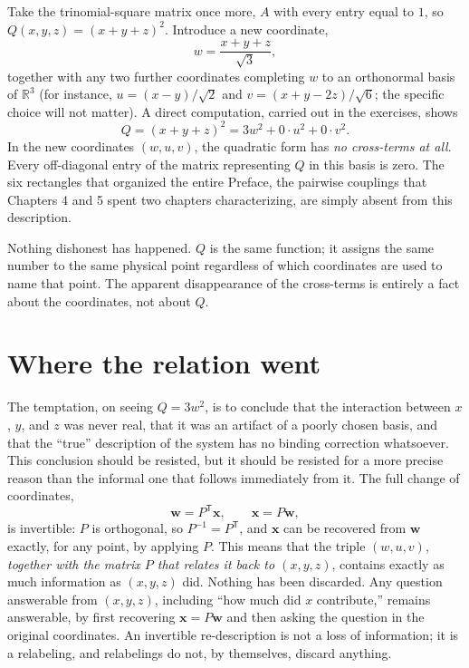 \documentclass[11pt]{book}
\begin{document}
Take the trinomial-square matrix once more, $A$ with every entry equal to $1$, so $Q(x,y,z)=(x+y+z)^2$. Introduce a new coordinate,
\[
w = \frac{x+y+z}{\sqrt3},
\]
together with any two further coordinates completing $w$ to an orthonormal basis of $\mathbb{R}^3$ (for instance, $u=(x-y)/\sqrt2$ and $v=(x+y-2z)/\sqrt6$; the specific choice will not matter). A direct computation, carried out in the exercises, shows
\[
Q = (x+y+z)^2 = 3w^2 + 0\cdot u^2 + 0\cdot v^2.
\]
In the new coordinates $(w,u,v)$, the quadratic form has \emph{no cross-terms at all}. Every off-diagonal entry of the matrix representing $Q$ in this basis is zero. The six rectangles that organized the entire Preface, the pairwise couplings that Chapters 4 and 5 spent two chapters characterizing, are simply absent from this description.

Nothing dishonest has happened. $Q$ is the same function; it assigns the same number to the same physical point regardless of which coordinates are used to name that point. The apparent disappearance of the cross-terms is entirely a fact about the coordinates, not about $Q$.

\section{Where the relation went}

The temptation, on seeing $Q=3w^2$, is to conclude that the interaction between $x$, $y$, and $z$ was never real, that it was an artifact of a poorly chosen basis, and that the ``true'' description of the system has no binding correction whatsoever. This conclusion should be resisted, but it should be resisted for a more precise reason than the informal one that follows immediately from it. The full change of coordinates,
\[
\mathbf{w} = P^{\mathsf T}\mathbf{x}, \qquad \mathbf{x} = P\mathbf{w},
\]
is invertible: $P$ is orthogonal, so $P^{-1}=P^{\mathsf T}$, and $\mathbf{x}$ can be recovered from $\mathbf{w}$ exactly, for any point, by applying $P$. This means that the triple $(w,u,v)$, \emph{together with the matrix $P$ that relates it back to $(x,y,z)$}, contains exactly as much information as $(x,y,z)$ did. Nothing has been discarded. Any question answerable from $(x,y,z)$, including ``how much did $x$ contribute,'' remains answerable, by first recovering $\mathbf{x}=P\mathbf{w}$ and then asking the question in the original coordinates. An invertible re-description is not a loss of information; it is a relabeling, and relabelings do not, by themselves, discard anything.
\end{document}
